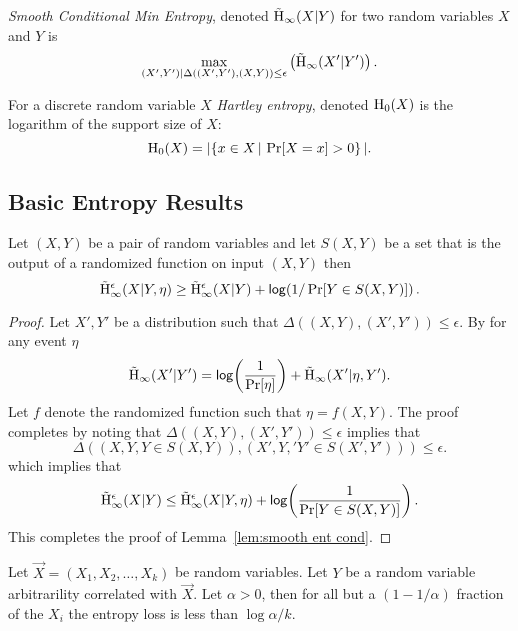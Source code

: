 \begin{definition}
    \emph{Smooth Conditional Min Entropy}, denoted $\tilde{\mathrm{H}}_{\infty}\!\left(X|Y\right)$ for two random variables $X$ and $Y$ is \[\max_{(X',Y') | \Delta((X', Y'), (X, Y))\le \epsilon} \left( \tilde{\mathrm{H}}_{\infty}\!\left(X'|Y'\right)\right).
    \] 
\end{definition}


\begin{definition}
For a discrete random variable $X$ \emph{Hartley entropy}, denoted $\mathrm{H}_0\!\left(X\right)$ is the logarithm of the support size of $X$: 
\[    \mathrm{H}_0\!\left(X\right) = | \!\left\{ x \in X\,|\, \Pr\!\left[X = x\right] > 0 \right\}|.
    \]
\end{definition}

\subsection{Basic Entropy Results}
\begin{lemma}
Let $(X, Y)$ be a pair of random variables and let $S(X, Y)$ be a set that is the output of a randomized function on input $(X, Y)$ then 
\[
\tilde{\mathrm{H}}_\infty^\epsilon(X|Y, \eta)\ge \tilde{\mathrm{H}}_\infty^\epsilon(X|Y) + \mathsf{log}\!\left( 1/\Pr[Y\in S(X, Y)]\right).
\]
\label{lem:smooth ent cond}
\end{lemma}
\begin{proof}
Let $X', Y'$ be a distribution such that $\Delta((X, Y), (X', Y')) \le \epsilon$.  By \cite[Lemma 7.8]{fuller2020fuzzy} for any event $\eta$
\begin{align*}
\tilde{\mathrm{H}}_\infty(X' | Y') =\mathsf{log}\!\left(\frac{1}{\Pr[\eta]}\right)+\tilde{\mathrm{H}}_\infty(X'| \eta, Y').
\end{align*}
Let $f$ denote the randomized function such that $\eta = f(X, Y)$.    
The proof completes by noting that $\Delta((X, Y), (X', Y'))\le \epsilon$ implies that 
\[
\Delta((X, Y, Y\in S(X, Y)), (X', Y,' Y'\in S(X', Y')))\le \epsilon.\]  which implies that 
\[
\tilde{\mathrm{H}}_\infty^\epsilon(X| Y) \le \tilde{\mathrm{H}}_\infty^\epsilon(X|Y, \eta) +\mathsf{log}\!\left(\frac{1}{\Pr[Y\in S(X,Y)]}\right).
\]
This completes the proof of Lemma~\ref{lem:smooth ent cond}.
\end{proof}


\begin{lemma}{\cite[Lemma 2.2a]{dodis2008fuzzy}}
    \label{lem:markovpred}
    Let $\vec{X} = (X_1, X_2, \ldots, X_k)$ be random variables. Let $Y$ be a random variable arbitrarility correlated with $\vec{X}$. 
    Let $\alpha > 0$, then for all but a $(1-1/\alpha)$ fraction of the $X_i$ the entropy loss is less than $\log{\alpha}/k$. 
\end{lemma}


